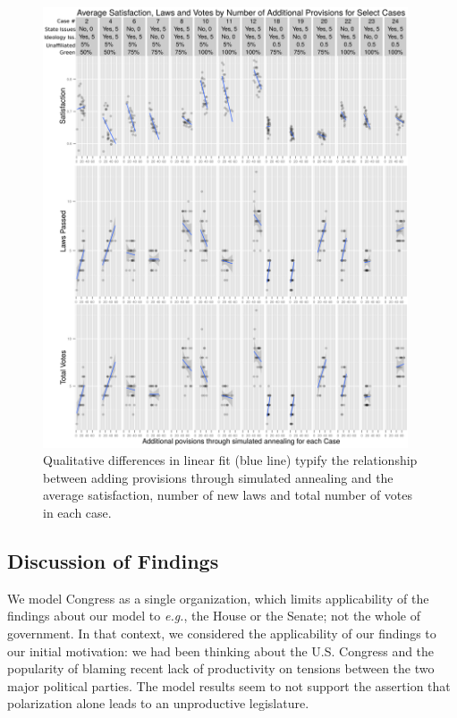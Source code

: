 \documentclass[pdftex,12pt]{llncs}
\begin{document}
\begin{figure}[h]
\centering
\includegraphics[width=4.25in]{combinedCases_crop.pdf}
\caption[ ]{Qualitative differences in linear fit (blue line) typify the relationship between adding provisions through simulated annealing and the average satisfaction, number of new laws and total number of votes in each case.} 
\label{combined}
\end{figure}

\subsection{Discussion of Findings}
We model Congress as a single organization, which limits applicability of the findings about our model to \textit{e.g.}, the House or the Senate; not the whole of government.
In that context, we considered the applicability of our findings to our initial motivation: we had been thinking about the U.S. Congress and the popularity of blaming recent lack of productivity on tensions between the two major political parties.  
The model results seem to not support the assertion that polarization alone leads to an unproductive legislature. 
\end{document}
